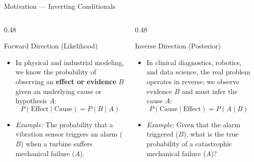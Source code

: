 \documentclass[10pt, aspectratio=169]{beamer}
\begin{document}
\begin{frame}{Motivation --- Inverting Conditionals}
  \begin{columns}[T]
    \begin{column}{0.48\textwidth}
      \begin{block}{Forward Direction (Likelihood)}
        \small
        \begin{itemize}\itemsep=0.1cm
          \item In physical and industrial modeling, we know the probability of observing an \textbf{effect or evidence} $B$ given an underlying cause or hypothesis $A$:
          $$P(\text{Effect} \mid \text{Cause}) = P(B \mid A)$$
          \item \emph{Example:} The probability that a vibration sensor triggers an alarm ($B$) when a turbine suffers mechanical failure ($A$).
        \end{itemize}
      \end{block}
    \end{column}
    \begin{column}{0.48\textwidth}
      \begin{alertblock}{Inverse Direction (Posterior)}
        \small
        \begin{itemize}\itemsep=0.1cm
          \item In clinical diagnostics, robotics, and data science, the real problem operates in reverse: we observe evidence $B$ and must infer the cause $A$:
          $$P(\text{Cause} \mid \text{Effect}) = P(A \mid B)$$
          \item \emph{Example:} Given that the alarm triggered ($B$), what is the true probability of a catastrophic mechanical failure ($A$)?
        \end{itemize}
      \end{alertblock}
    \end{column}
  \end{columns}
\end{frame}
\end{document}
